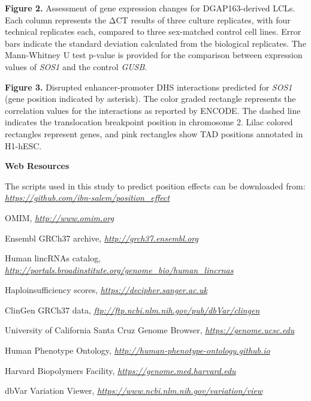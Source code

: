 \documentclass[a4paper,twoside=true,openright,parskip=full,chapterprefix=true,11pt,headings=normal,bibliography=totoc,listof=totoc,titlepage=on,captions=tableabove,draft=false]{scrreprt}
\theoremstyle{definition}
\theoremstyle{definition}
\theoremstyle{definition}
\theoremstyle{remark}
\begin{document}
\textbf{Figure 2.} Assessment of gene expression changes for
DGAP163-derived LCLs. Each column represents the ΔCT results of three
culture replicates, with four technical replicates each, compared to
three sex-matched control cell lines. Error bars indicate the standard
deviation calculated from the biological replicates. The Mann-Whitney U
test p-value is provided for the comparison between expression values of
\emph{SOS1} and the control \emph{GUSB}.

\textbf{Figure 3.} Disrupted enhancer-promoter DHS interactions
predicted for \emph{SOS1} (gene position indicated by asterisk). The
color graded rectangle represents the correlation values for the
interactions as reported by ENCODE. The dashed line indicates the
translocation breakpoint position in chromosome 2. Lilac colored
rectangles represent genes, and pink rectangles show TAD positions
annotated in H1-hESC.

\textbf{Web Resources}

The scripts used in this study to predict position effects can be
downloaded from:
\href{https://github.com/ibn-salem/position_effect}{\emph{https://github.com/ibn-salem/position\_effect}}

OMIM, \href{http://www.omim.org/}{\emph{http://www.omim.org}}

Ensembl GRCh37 archive,
\href{http://grch37.ensembl.org/}{\emph{http://grch37.ensembl.org}}

Human lincRNAs catalog,
\href{http://portals.broadinstitute.org/genome_bio/human_lincrnas}{\emph{http://portals.broadinstitute.org/genome\_bio/human\_lincrnas}}

Haploinsufficiency scores,
\href{https://decipher.sanger.ac.uk/}{\emph{https://decipher.sanger.ac.uk}}

ClinGen GRCh37 data,
\href{ftp://ftp.ncbi.nlm.nih.gov/pub/dbVar/clingen}{\emph{ftp://ftp.ncbi.nlm.nih.gov/pub/dbVar/clingen}}

University of California Santa Cruz Genome Browser,
\href{https://genome.ucsc.edu/}{\emph{https://genome.ucsc.edu}}

Human Phenotype Ontology,
\href{http://human-phenotype-ontology.github.io/}{\emph{http://human-phenotype-ontology.github.io}}

Harvard Biopolymers Facility,
\href{https://genome.med.harvard.edu/}{\emph{https://genome.med.harvard.edu}}

dbVar Variation Viewer,
\href{https://www.ncbi.nlm.nih.gov/variation/view}{\emph{https://www.ncbi.nlm.nih.gov/variation/view}}
\end{document}
